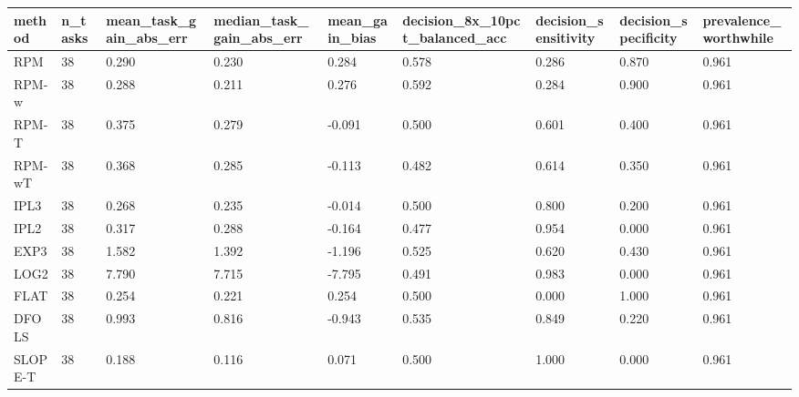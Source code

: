 \begin{tabular}{lllllllll}
\hline
method & n\_tasks & mean\_task\_gain\_abs\_err & median\_task\_gain\_abs\_err & mean\_gain\_bias & decision\_8x\_10pct\_balanced\_acc & decision\_sensitivity & decision\_specificity & prevalence\_worthwhile \\
\hline
RPM & 38 & 0.290 & 0.230 & 0.284 & 0.578 & 0.286 & 0.870 & 0.961 \\
RPM-w & 38 & 0.288 & 0.211 & 0.276 & 0.592 & 0.284 & 0.900 & 0.961 \\
RPM-T & 38 & 0.375 & 0.279 & -0.091 & 0.500 & 0.601 & 0.400 & 0.961 \\
RPM-wT & 38 & 0.368 & 0.285 & -0.113 & 0.482 & 0.614 & 0.350 & 0.961 \\
IPL3 & 38 & 0.268 & 0.235 & -0.014 & 0.500 & 0.800 & 0.200 & 0.961 \\
IPL2 & 38 & 0.317 & 0.288 & -0.164 & 0.477 & 0.954 & 0.000 & 0.961 \\
EXP3 & 38 & 1.582 & 1.392 & -1.196 & 0.525 & 0.620 & 0.430 & 0.961 \\
LOG2 & 38 & 7.790 & 7.715 & -7.795 & 0.491 & 0.983 & 0.000 & 0.961 \\
FLAT & 38 & 0.254 & 0.221 & 0.254 & 0.500 & 0.000 & 1.000 & 0.961 \\
DFOLS & 38 & 0.993 & 0.816 & -0.943 & 0.535 & 0.849 & 0.220 & 0.961 \\
SLOPE-T & 38 & 0.188 & 0.116 & 0.071 & 0.500 & 1.000 & 0.000 & 0.961 \\
\hline
\end{tabular}
